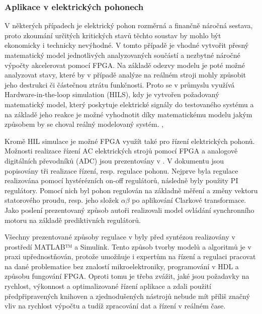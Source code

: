 \documentclass[a4paper, twoside, 11pt]{article}
\begin{document}
			\subsubsection{Aplikace v elektrických pohonech}
			V některých případech je elektrický pohon rozměrná a finančně náročná sestava, proto zkoumání určitých kritických stavů těchto soustav by mohlo být ekonomicky i technicky nevýhodné. V tomto případě je vhodné vytvořit přesný matematický model jednotlivých analyzovaných součástí a nezbytné náročné výpočty akcelerovat pomocí FPGA. Na základě odezvy modelu je poté možné analyzovat stavy, které by v případě analýze na reálném stroji mohly způsobit jeho destrukci či částečnou ztrátu funkčnosti. Proto se v průmyslu využívá Hardware-in-the-loop simulation (HILS), kdy je vytvořen požadovaný matematický model, který poskytuje elektrické signály do testovaného systému a na základě jeho reakce je možné vyhodnotit díky matematickému modelu jakým způsobem by se choval reálný modelovaný systém. \cite{andina-advanced-features-and-industrial-applications-of-fpga}, \cite{mathworks-discovery-hil-simulation}\par
			Kromě HIL simulace je možné FPGA využít také pro řízení elektrických pohonů. Možnosti realizace řízení AC elektrických strojů pomocí FPGA a analogově digitálních převodníků (ADC) jsou prezentovány v \cite{naouar-fpga-based-current-controllers-for-ac-machine-drives}. V dokumentu jsou popisovány tři realizace řízení, resp. regulace pohonu. Nejprve byla regulace realizována pomocí hystérézních on-off regulátorů, následně byly použity PI regulátory. Pomocí nich byl pohon regulován na základně měření a změny vektoru statorového proudu, resp. jeho složek $\alpha \beta$ po aplikování Clarkové transformace. Jako poslení prezentovaný způsob autoři realizovali model ovládání synchronního motoru na základě prediktivních regulátorů. \cite{naouar-fpga-based-current-controllers-for-ac-machine-drives}\par Všechny prezentované způsoby regulace v \cite{naouar-fpga-based-current-controllers-for-ac-machine-drives} byly před syntézou realizovány v prostředí MATLAB™️ a Simulink. Tento způsob tvorby modelů a algoritmů je v praxi upřednostňován, protože umožňuje i expertům na řízení a regulaci pracovat na dané problematice bez znalostí mikroelektroniky, programování v HDL a způsobu fungování FPGA. Oproti tomu je třeba zvážit, jaké jsou požadavky na rychlost, výkonnost a optimalizované řízení aplikace a zdali použití předpřipravených knihoven a zjednodušených nástrojů nebude mít příliš značný vliv na rychlost výpočtu a tudíž zpracování dat a řízení v reálném čase. \cite{naouar-fpga-based-current-controllers-for-ac-machine-drives}
			
\end{document}
